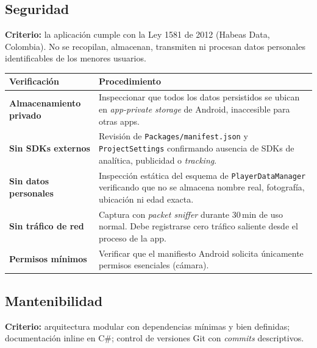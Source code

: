 \documentclass[12pt, a4paper]{article}
\begin{document}
\subsection{Seguridad}

\textbf{Criterio:} la aplicación cumple con la Ley 1581 de 2012 (Habeas Data,
Colombia). No se recopilan, almacenan, transmiten ni procesan datos personales
identificables de los menores usuarios.

\begin{table}[H]
  \centering
  \renewcommand{\arraystretch}{1.3}
  \begin{tabular}{>{\bfseries}p{4cm} p{8cm}}
    \toprule
    Verificación & Procedimiento \\
    \midrule
    Almacenamiento privado & Inspeccionar que todos los datos persistidos
                              se ubican en \textit{app-private storage}
                              de Android, inaccesible para otras apps. \\
    Sin SDKs externos      & Revisión de \texttt{Packages/manifest.json} y
                              \texttt{ProjectSettings} confirmando ausencia
                              de SDKs de analítica, publicidad o \textit{tracking}. \\
    Sin datos personales   & Inspección estática del esquema de
                              \texttt{PlayerDataManager} verificando que no
                              se almacena nombre real, fotografía, ubicación
                              ni edad exacta. \\
    Sin tráfico de red     & Captura con \textit{packet sniffer} durante
                              30\,min de uso normal. Debe registrarse cero
                              tráfico saliente desde el proceso de la app. \\
    Permisos mínimos       & Verificar que el manifiesto Android solicita
                              únicamente permisos esenciales (cámara). \\
    \bottomrule
  \end{tabular}
\end{table}

\subsection{Mantenibilidad}

\textbf{Criterio:} arquitectura modular con dependencias mínimas y bien
definidas; documentación inline en C\#; control de versiones Git con
\textit{commits} descriptivos.
\end{document}
